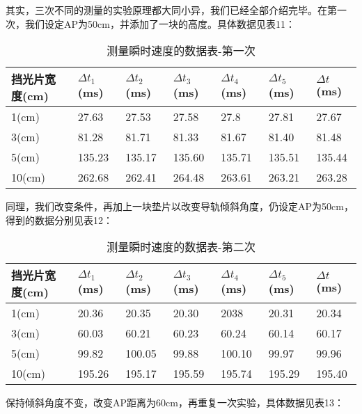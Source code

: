 \documentclass[11pt]{article}
\begin{document}
其实，三次不同的测量的实验原理都大同小异，我们已经全部介绍完毕。在第一次，我们设定AP为50cm，并添加了一块的高度。具体数据见表11：

\begin{table}[!ht]
    \centering
    \begin{tabular}{|l|l|l|l|l|l|l|}
    \hline
        挡光片宽度(cm) & $\Delta t_1$(ms) & $\Delta t_2$(ms) & $\Delta t_3$(ms) & $\Delta t_4$(ms) & $\Delta t_5$(ms) & $\Delta t$(ms) \\ \hline
        1(cm)     & 27.63  & 27.53  & 27.58    & 27.8     & 27.81  & 27.67  \\ \hline
        3(cm)     & 81.28   & 81.71  & 81.33    & 81.67    & 81.40  & 81.48   \\ \hline
        5(cm)     & 135.23  & 135.17 & 135.60   & 135.71   & 135.51  & 135.44  \\ \hline
        10(cm)    & 262.68  & 262.41 & 264.48   & 263.61   & 263.21  & 263.28  \\ \hline
    \end{tabular}
    \caption{测量瞬时速度的数据表-第一次}
\end{table}

同理，我们改变条件，再加上一块垫片以改变导轨倾斜角度，仍设定AP为50cm，得到的数据分别见表12：

\begin{table}[!ht]
    \centering
    \begin{tabular}{|l|l|l|l|l|l|l|}
    \hline
        挡光片宽度(cm) & $\Delta t_1$(ms) & $\Delta t_2$(ms) & $\Delta t_3$(ms) & $\Delta t_4$(ms) & $\Delta t_5$(ms) & $\Delta t$(ms) \\ \hline
        1(cm)     & 20.36  & 20.35  & 20.30  & 2038   & 20.31  & 20.34  \\ \hline
        3(cm)     & 60.03  & 60.21  & 60.23  & 60.24  & 60.14  & 60.17  \\ \hline
        5(cm)     & 99.82  & 100.05 & 99.88  & 100.10 & 99.97  & 99.96  \\ \hline
        10(cm)    & 195.26 & 195.17 & 195.59 & 195.74 & 195.29 & 195.40 \\ \hline
    \end{tabular}
    \caption{测量瞬时速度的数据表-第二次}
\end{table}

保持倾斜角度不变，改变AP距离为60cm，再重复一次实验，具体数据见表13：
\end{document}
